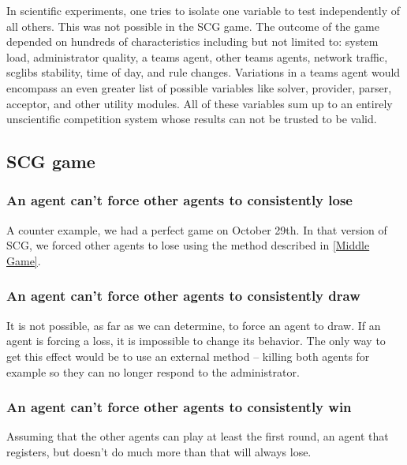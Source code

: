 \documentclass[letterpaper,12pt,oneside]{article}
\begin{document}
In scientific experiments, one tries to isolate one variable
to test independently of all others. This was not possible in the SCG game. The
outcome of the game depended on hundreds of characteristics including but not
limited to: system load, administrator quality, a teams agent, other teams
agents, network traffic, scglibs stability, time of day, and rule changes.
Variations in a teams agent would encompass an even greater list of possible
variables like solver, provider, parser, acceptor, and other utility modules.
All of these variables sum up to an entirely unscientific competition system
whose results can not be trusted to be valid.

\subsection{SCG game}

\subsubsection{An agent can't force other agents to consistently lose}

A counter example, we had a perfect game on October 29th. In that version
of SCG, we forced other agents to lose using the method described in
\ref{Middle Game}.

\subsubsection{An agent can't force other agents to consistently draw}

It is not possible, as far as we can determine, to force an agent to draw. If
an agent is forcing a loss, it is impossible to change its behavior. The only
way to get this effect would be to use an external method -- killing both
agents for example so they can no longer respond to the administrator.

\subsubsection{An agent can't force other agents to consistently win}

Assuming that the other agents can play at least the first round, an agent
that registers, but doesn't do much more than that will always lose.


% 
%
{}

\end{document}
